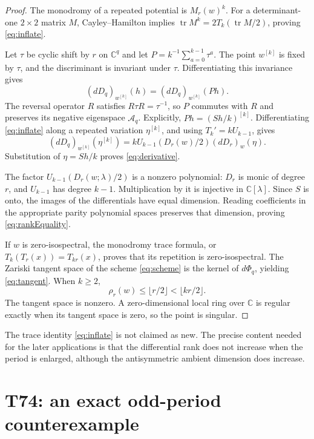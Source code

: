 \documentclass[11pt,a4paper]{article}
\theoremstyle{definition}
\theoremstyle{remark}
\newcommand{\C}{\mathbb C}
\newcommand{\A}{\mathcal A}
\newcommand{\tr}{\operatorname{tr}}
\begin{document}
\begin{proof}
The monodromy of a repeated potential is $M_r(w)^k$. For a determinant-one
$2\times2$ matrix $M$, Cayley--Hamilton implies
$\tr M^k=2T_k(\tr M/2)$, proving \eqref{eq:inflate}.

Let $\tau$ be cyclic shift by $r$ on $\C^q$ and let
$P=k^{-1}\sum_{a=0}^{k-1}\tau^a$. The point $w^{[k]}$ is fixed by $\tau$,
and the discriminant is invariant under $\tau$. Differentiating this
invariance gives
\[
 (dD_q)_{w^{[k]}}(h)=(dD_q)_{w^{[k]}}(Ph).
\]
The reversal operator $R$ satisfies $R\tau R=\tau^{-1}$, so $P$ commutes
with $R$ and preserves its negative eigenspace $\A_q$. Explicitly,
$Ph=(Sh/k)^{[k]}$. Differentiating \eqref{eq:inflate} along a repeated
variation $\eta^{[k]}$, and using $T_k'=kU_{k-1}$, gives
\[
 (dD_q)_{w^{[k]}}(\eta^{[k]})
   =kU_{k-1}(D_r(w)/2)(dD_r)_w(\eta).
\]
Substitution of $\eta=Sh/k$ proves \eqref{eq:derivative}.

The factor $U_{k-1}(D_r(w;\lambda)/2)$ is a nonzero polynomial: $D_r$ is
monic of degree $r$, and $U_{k-1}$ has degree $k-1$. Multiplication by it
is injective in $\C[\lambda]$. Since $S$ is onto, the images of the
differentials have equal dimension. Reading coefficients in the appropriate
parity polynomial spaces preserves that dimension, proving
\eqref{eq:rankEquality}.

If $w$ is zero-isospectral, the monodromy trace formula, or
$T_k(T_r(x))=T_{kr}(x)$, proves that its repetition is zero-isospectral.
The Zariski tangent space of the scheme \eqref{eq:scheme} is the kernel of
$d\Phi_q$, yielding \eqref{eq:tangent}. When $k\geq2$,
\[
 \rho_r(w)\leq\lfloor r/2\rfloor<\lfloor kr/2\rfloor.
\]
The tangent space is nonzero. A zero-dimensional local ring over $\C$ is
regular exactly when its tangent space is zero, so the point is singular.
\end{proof}

The trace identity \eqref{eq:inflate} is not claimed as new. The precise
content needed for the later applications is that the differential rank
does not increase when the period is enlarged, although the antisymmetric
ambient dimension does increase.

\section{T74: an exact odd-period counterexample}
\end{document}
